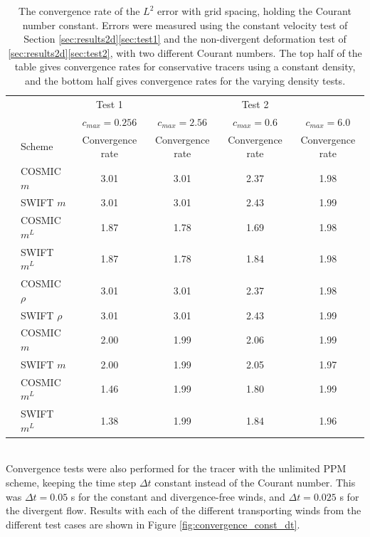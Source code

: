\documentclass{ametsocV6.1}
\begin{document}
\begin{table}[h!]
\small
\begin{center}
\begin{tabular}{| c | l | c  c | c c |} \hline
  &  & Test 1 & & Test 2 &  \\
  &  & $c_{max}=0.256$ & $c_{max}=2.56$ & $c_{max}=0.6$ & $c_{max}=6.0$ \\
  & Scheme &  Convergence rate & Convergence rate & Convergence rate & Convergence rate   \\ \hline
  \parbox[t]{2mm}{}
  & COSMIC $m$ & 3.01 & 3.01 & 2.37 & 1.98 \\
  & SWIFT $m$ & 3.01 & 3.01 & 2.43 & 1.99 \\
  & COSMIC $m^L$ & 1.87 & 1.78 & 1.69 & 1.98 \\
  & SWIFT  $m^L$ & 1.87 & 1.78 & 1.84 & 1.98 \\ \hline
  \parbox[t]{2mm}{}
  & COSMIC $\rho$ & 3.01 & 3.01 & 2.37 & 1.98 \\
  & SWIFT $\rho$ & 3.01 & 3.01 & 2.43 & 1.99 \\
  & COSMIC $m$ & 2.00 & 1.99 & 2.06 & 1.99 \\
  & SWIFT $m$ & 2.00 & 1.99 & 2.05 & 1.97\\
  & COSMIC $m^L$ & 1.46 & 1.99 & 1.80 & 1.99 \\
  & SWIFT $m^L$ & 1.38 & 1.99 & 1.84 & 1.96 \\ \hline
\end{tabular}
\caption{The convergence rate of the $L^2$ error with grid spacing, holding the Courant number constant. Errors were measured using the constant velocity test of Section \ref{sec:results2d}\ref{sec:test1} and the non-divergent deformation test of \ref{sec:results2d}\ref{sec:test2}, with two different Courant numbers.
The top half of the table gives convergence rates for conservative tracers using a constant density, and the bottom half gives convergence rates for the varying density tests.}
\label{table:convergence_const_c}
\end{center}
\end{table}
\\
Convergence tests were also performed for the tracer with the unlimited PPM scheme, keeping the time step $\Delta t$ constant instead of the Courant number.
This was $\Delta t=0.05$ s for the constant and divergence-free winds, and $\Delta t=0.025$ s for the divergent flow.
Results with each of the different transporting winds from the different test cases are shown in Figure \ref{fig:convergence_const_dt}.
\end{document}

